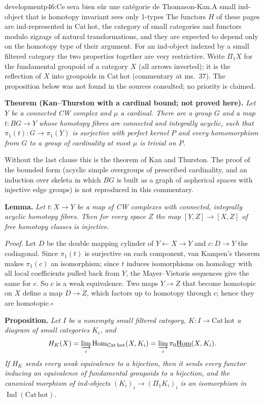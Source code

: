 \begin{dcomment}{development}{p46:Ce sera bien sûr une catégorie de Thomason-Kan.}{A small ind-object that is homotopy invariant sees only 1-types}
The functors $H$ of these pages are ind-represented in $\mathrm{Cat}\,\mathrm{hot}$, the category of small categories and functors modulo zigzags of natural transformations, and they are expected to depend only on the homotopy type of their argument. For an ind-object indexed by a small filtered category the two properties together are very restrictive. Write $\Pi_1X$ for the fundamental groupoid of a category $X$ (all arrows inverted); it is the reflection of $X$ into groupoids in $\mathrm{Cat}\,\mathrm{hot}$ (commentary at ms.~37). The proposition below was not found in the sources consulted; no priority is claimed.

\textbf{Theorem (Kan--Thurston with a cardinal bound; not proved here).}
\textit{Let $Y$ be a connected CW complex and $\mu$ a cardinal. There are a group $G$ and a map $t:BG\to Y$ whose homotopy fibres are connected and integrally acyclic, such that $\pi_1(t):G\to\pi_1(Y)$ is surjective with perfect kernel $P$ and every homomorphism from $G$ to a group of cardinality at most $\mu$ is trivial on $P$.}

Without the last clause this is the theorem of Kan and Thurston. The proof of the bounded form (acyclic simple overgroups of prescribed cardinality, and an induction over skeleta in which $BG$ is built as a graph of aspherical spaces with injective edge groups) is not reproduced in this commentary.

\textbf{Lemma.}
\textit{Let $t:X\to Y$ be a map of CW complexes with connected, integrally acyclic homotopy fibres. Then for every space $Z$ the map $[Y,Z]\to[X,Z]$ of free homotopy classes is injective.}

\textit{Proof.}
Let $D$ be the double mapping cylinder of $Y\leftarrow X\to Y$ and $c:D\to Y$ the codiagonal. Since $\pi_1(t)$ is surjective on each component, van Kampen's theorem makes $\pi_1(c)$ an isomorphism; since $t$ induces isomorphisms on homology with all local coefficients pulled back from $Y$, the Mayer--Vietoris sequences give the same for $c$. So $c$ is a weak equivalence. Two maps $Y\to Z$ that become homotopic on $X$ define a map $D\to Z$, which factors up to homotopy through $c$; hence they are homotopic.\hfill$\square$

\textbf{Proposition.}\ours
\textit{Let $I$ be a nonempty small filtered category, $K:I\to\mathrm{Cat}\,\mathrm{hot}$ a diagram of small categories $K_i$, and
\[
 H_K(X)=\varinjlim_i\operatorname{Hom}_{\mathrm{Cat}\,\mathrm{hot}}(X,K_i)=\varinjlim_i\pi_0\underline{\operatorname{Hom}}(X,K_i).
\]
If $H_K$ sends every weak equivalence to a bijection, then it sends every functor inducing an equivalence of fundamental groupoids to a bijection, and the canonical morphism of ind-objects $(K_i)_i\to(\Pi_1K_i)_i$ is an isomorphism in $\operatorname{Ind}(\mathrm{Cat}\,\mathrm{hot})$.}


\end{dcomment}
